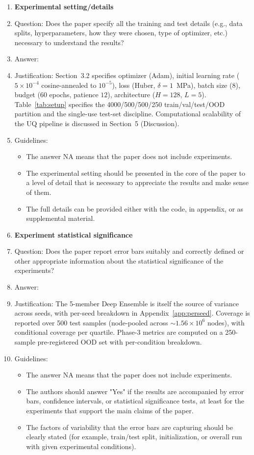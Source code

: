 \documentclass{article}
\begin{document}
\begin{enumerate}
\item {\bf Experimental setting/details}
    \item[] Question: Does the paper specify all the training and test details (e.g., data splits, hyperparameters, how they were chosen, type of optimizer, etc.) necessary to understand the results?
    \item[] Answer: \answerYes{}
    \item[] Justification: Section~3.2 specifies optimizer (Adam), initial learning rate ($5\times 10^{-4}$ cosine-annealed to $10^{-5}$), loss (Huber, $\delta=1$~MPa), batch size ($8$), budget ($60$ epochs, patience $12$), architecture ($H{=}128$, $L{=}5$). Table~\ref{tab:setup} specifies the 4000/500/500/250 train/val/test/OOD partition and the single-use test-set discipline. Computational scalability of the UQ pipeline is discussed in Section~5 (Discussion).
    \item[] Guidelines:
    \begin{itemize}
        \item The answer NA means that the paper does not include experiments.
        \item The experimental setting should be presented in the core of the paper to a level of detail that is necessary to appreciate the results and make sense of them.
        \item The full details can be provided either with the code, in appendix, or as supplemental material.
    \end{itemize}

\item {\bf Experiment statistical significance}
    \item[] Question: Does the paper report error bars suitably and correctly defined or other appropriate information about the statistical significance of the experiments?
    \item[] Answer: \answerYes{}
    \item[] Justification: The 5-member Deep Ensemble is itself the source of variance across seeds, with per-seed breakdown in Appendix~\ref{app:perseed}. Coverage is reported over 500 test samples (node-pooled across $\sim 1.56\times 10^{6}$ nodes), with conditional coverage per quartile. Phase-3 metrics are computed on a 250-sample pre-registered OOD set with per-condition breakdown.
    \item[] Guidelines:
    \begin{itemize}
        \item The answer NA means that the paper does not include experiments.
        \item The authors should answer "Yes" if the results are accompanied by error bars, confidence intervals, or statistical significance tests, at least for the experiments that support the main claims of the paper.
        \item The factors of variability that the error bars are capturing should be clearly stated (for example, train/test split, initialization, or overall run with given experimental conditions).
    \end{itemize}


\end{enumerate}
\end{document}
